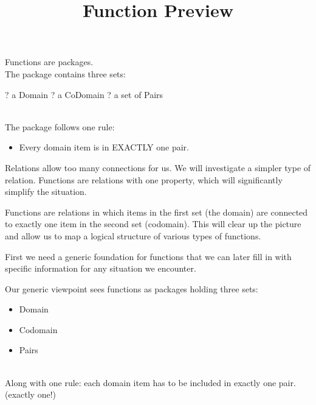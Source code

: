 \documentclass{ximera}
\title{Function Preview}
\begin{document}
\begin{abstract}
\end{abstract}

\maketitle





\begin{sectionOutcomes}

Functions are packages. \\
The package contains three sets:

\begin{itemize}
   ? a Domain
   ? a CoDomain
   ? a set of Pairs
\end{itemize}
\quad \\

The package follows one rule:
\begin{itemize}
\item Every domain item is in EXACTLY one pair.
\end{itemize}
\end{sectionOutcomes}







Relations allow too many connections for us.  We will investigate a simpler type of relation. Functions are relations with one property, which will significantly simplify the situation.

Functions are relations in which items in the first set (the domain) are connected to exactly one item in the second set (codomain).  This will clear up the picture and allow us to map a logical structure of various types of functions.

First we need a generic foundation for functions that we can later fill in with specific information for any situation we encounter. 

Our generic viewpoint sees functions as packages holding three sets:
\begin{itemize}
\item Domain 
\item Codomain 
\item Pairs
\end{itemize}

\quad \\

Along with one rule: each domain item has to be included in exactly one pair. (exactly one!)
\end{document}

